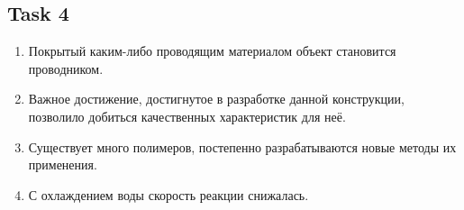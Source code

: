 \subsection*{Task 4}

\begin{enumerate}
    \item Покрытый каким-либо проводящим материалом объект становится проводником.
    \item Важное достижение, достигнутое в разработке данной конструкции, позволило добиться качественных характеристик для неё.
    \item Существует много полимеров, постепенно разрабатываются новые методы их применения.
    \item С охлаждением воды скорость реакции снижалась.
\end{enumerate}

